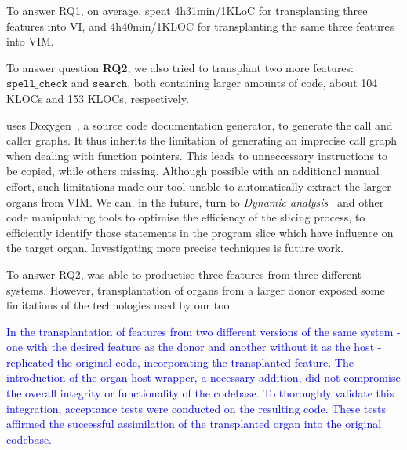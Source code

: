 \begin{framed}
\noindent To answer RQ1, on average, \prodscalpel spent 4h31min/1KLoC for transplanting three features into VI, and 4h40min/1KLOC for transplanting the same three features into VIM.
\end{framed}

To answer question \textbf{RQ2}, we also tried to transplant two more features:  $\texttt{spell\_check}$ and $\texttt{search}$,  both containing larger amounts of code, about 104 KLOCs and 153 KLOCs, respectively.

\prodscalpel uses Doxygen~\cite{Doxygen2018}, a source code documentation generator, to generate the call and caller graphs. 
It thus inherits the limitation of generating an imprecise call graph when dealing with function pointers. 
This leads to unneccessary instructions to be copied, while others missing.
Although possible with an additional manual effort, such limitations made our tool unable to automatically extract the larger organs from VIM. 
We can, in the future, turn to \emph{Dynamic analysis}~\cite{Cornelissen2009} and other code manipulating tools to optimise the efficiency of the slicing process, to efficiently identify those statements in the program slice which have influence on the target organ. Investigating more precise techniques is future work.

\begin{framed}
\noindent To answer RQ2, \prodscalpel was able to productise three features from three different systems. However, transplantation of organs from a larger donor exposed some limitations of the technologies used by our tool.
\end{framed}

\textcolor{blue}{In the transplantation of features from two different versions of the same system - one with the desired feature as the donor and another without it as the host - \prodscalpel replicated the original code, incorporating the transplanted feature. The introduction of the organ-host wrapper, a necessary addition, did not compromise the overall integrity or functionality of the codebase. To thoroughly validate this integration, acceptance tests were conducted on the resulting code. These tests affirmed the successful assimilation of the transplanted organ into the original codebase.}


